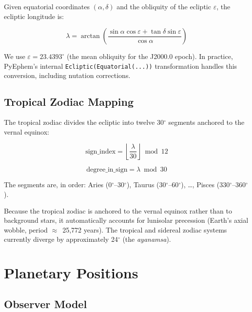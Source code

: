 \documentclass[11pt,letterpaper,twocolumn]{article}
\begin{document}
Given equatorial coordinates $(\alpha, \delta)$ and the obliquity of the ecliptic $\varepsilon$, the ecliptic longitude is:

\begin{equation}\label{eq:ecl}
\lambda = \arctan\!\left(\frac{\sin\alpha\cos\varepsilon + \tan\delta\sin\varepsilon}{\cos\alpha}\right)
\end{equation}

We use $\varepsilon = 23.4393^\circ$ (the mean obliquity for the J2000.0 epoch). In practice, PyEphem's internal \texttt{Ecliptic(Equatorial(...))} transformation handles this conversion, including nutation corrections.

\subsection{Tropical Zodiac Mapping}

The tropical zodiac divides the ecliptic into twelve 30$^\circ$ segments anchored to the vernal equinox:

\begin{equation}
\text{sign\_index} = \left\lfloor \frac{\lambda}{30} \right\rfloor \bmod 12
\end{equation}

\begin{equation}
\text{degree\_in\_sign} = \lambda \bmod 30
\end{equation}

The segments are, in order: Aries (0$^\circ$--30$^\circ$), Taurus (30$^\circ$--60$^\circ$), \ldots, Pisces (330$^\circ$--360$^\circ$).

Because the tropical zodiac is anchored to the vernal equinox rather than to background stars, it automatically accounts for lunisolar precession (Earth's axial wobble, period $\approx$~25,772 years). The tropical and sidereal zodiac systems currently diverge by approximately 24$^\circ$ (the \textit{ayanamsa}).

\section{Planetary Positions}\label{sec:planets}

\subsection{Observer Model}
\end{document}
